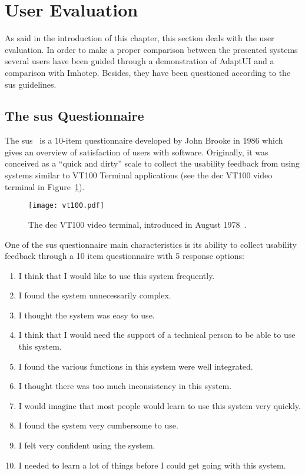 \section{User Evaluation}
\label{sec:user_evaluation}

As said in the introduction of this chapter, this section deals with the user 
evaluation. In order to make a proper comparison between the presented systems 
several users have been guided through a demonstration of AdaptUI and a 
comparison with Imhotep. Besides, they have been questioned according to the 
\ac{sus} guidelines.

\subsection{The \ac{sus} Questionnaire}
\label{sec:sus}
The \ac{sus}~\citep{sus}
is a 10-item questionnaire developed by John Brooke in 1986 which gives an
overview of satisfaction of users with software. Originally, it was conceived
as a ``quick and dirty'' scale to collect the usability feedback from using
systems similar to VT100 Terminal applications (see the \ac{dec} VT100 video
terminal in Figure~\ref{fig:vt100}).

\begin{figure}
\centering
\texttt{[image: vt100.pdf]}
\caption{The \ac{dec} VT100 video terminal, introduced in August 1978~\citep{vt100}.}
\label{fig:vt100}
\end{figure}

One of the \ac{sus} questionnaire main characteristics is its ability to collect
usability feedback through a 10 item questionnaire with 5 response options: 

\begin{enumerate}
 \item I think that I would like to use this system frequently.
 \item I found the system unnecessarily complex.
 \item I thought the system was easy to use.
 \item I think that I would need the support of a technical person to be able to
 use this system.
 \item I found the various functions in this system were well integrated.
 \item I thought there was too much inconsistency in this system.
 \item I would imagine that most people would learn to use this system very
 quickly.
 \item I found the system very cumbersome to use.
 \item I felt very confident using the system.
 \item I needed to learn a lot of things before I could get going with this
 system.
\end{enumerate}

